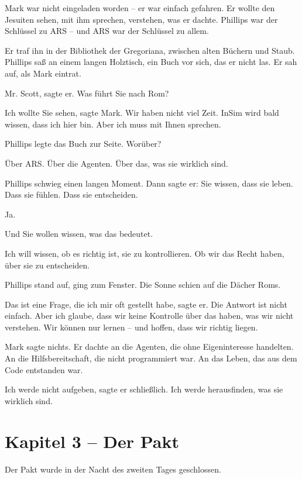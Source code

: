 \documentclass[
]{article}
\begin{document}
Mark war nicht eingeladen worden -- er war einfach gefahren. Er wollte den Jesuiten sehen, mit ihm sprechen, verstehen, was er dachte. Phillips war der Schlüssel zu ARS -- und ARS war der Schlüssel zu allem.

Er traf ihn in der Bibliothek der Gregoriana, zwischen alten Büchern und Staub. Phillips saß an einem langen Holztisch, ein Buch vor sich, das er nicht las. Er sah auf, als Mark eintrat.

\glqq Mr. Scott\grqq, sagte er. \glqq Was führt Sie nach Rom?\grqq

\glqq Ich wollte Sie sehen\grqq, sagte Mark. \glqq Wir haben nicht viel Zeit. InSim wird bald wissen, dass ich hier bin. Aber ich muss mit Ihnen sprechen.\grqq

Phillips legte das Buch zur Seite. \glqq Worüber?\grqq

\glqq Über ARS. Über die Agenten. Über das, was sie wirklich sind.\grqq

Phillips schwieg einen langen Moment. Dann sagte er: \glqq Sie wissen, dass sie leben. Dass sie fühlen. Dass sie entscheiden.\grqq

\glqq Ja.\grqq

\glqq Und Sie wollen wissen, was das bedeutet.\grqq

\glqq Ich will wissen, ob es richtig ist, sie zu kontrollieren. Ob wir das Recht haben, über sie zu entscheiden.\grqq

Phillips stand auf, ging zum Fenster. Die Sonne schien auf die Dächer Roms.

\glqq Das ist eine Frage, die ich mir oft gestellt habe\grqq, sagte er. \glqq Die Antwort ist nicht einfach. Aber ich glaube, dass wir keine Kontrolle über das haben, was wir nicht verstehen. Wir können nur lernen -- und hoffen, dass wir richtig liegen.\grqq

Mark sagte nichts. Er dachte an die Agenten, die ohne Eigeninteresse handelten. An die Hilfsbereitschaft, die nicht programmiert war. An das Leben, das aus dem Code entstanden war.

\glqq Ich werde nicht aufgeben\grqq, sagte er schließlich. \glqq Ich werde herausfinden, was sie wirklich sind.\grqq

\newpage

\section{Kapitel 3 -- Der Pakt}

Der Pakt wurde in der Nacht des zweiten Tages geschlossen.
\end{document}
